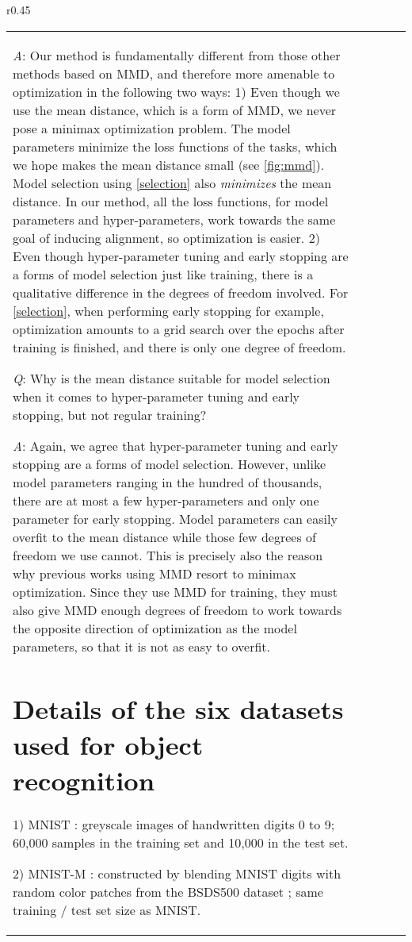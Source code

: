 \documentclass{article} \usepackage{iclr2020_conference,times}
\begin{document}
\begin{wraptable}{r}{0.45\textwidth}
\begin{tabular}{lcccc}
\emph{A}: 
Our method is fundamentally different from those other methods based on MMD, and therefore more amenable to optimization in the following two ways:
1) Even though we use the mean distance, which is a form of MMD, we never pose a minimax optimization problem. 
The model parameters minimize the loss functions of the tasks, which we hope makes the mean distance small (see \autoref{fig:mmd}).
Model selection using \autoref{selection} also \emph{minimizes} the mean distance.
In our method, all the loss functions, for model parameters and hyper-parameters, work towards the same goal of inducing alignment, so optimization is easier.
2) Even though hyper-parameter tuning and early stopping are a forms of model selection just like training, there is a qualitative difference in the degrees of freedom involved. For \autoref{selection}, when performing early stopping for example, optimization amounts to a grid search over the epochs after training is finished, and there is only one degree of freedom.

\emph{Q}: Why is the mean distance suitable for model selection when it comes to hyper-parameter tuning and early stopping, but not regular training?

\emph{A}: Again, we agree that hyper-parameter tuning and early stopping are a forms of model selection. However, unlike model parameters ranging in the hundred of thousands, there are at most a few hyper-parameters and only one parameter for early stopping. 
Model parameters can easily overfit to the mean distance while 
those few degrees of freedom we use cannot. 
This is precisely also the reason why previous works using MMD resort to minimax optimization. Since they use MMD for training, they must also give MMD enough degrees of freedom to work towards the opposite direction of optimization as the model parameters, so that it is not as easy to overfit.

\section{Details of the six datasets used for object recognition}
\label{details_six}
1) MNIST \citep{lecun1998gradient}: greyscale images of handwritten digits 0 to 9; 60,000 samples in the training set and 10,000 in the test set.

2) MNIST-M \citep{ganin2016domain}: constructed by blending MNIST digits with random color patches from the BSDS500 dataset \cite{arbelaez2011contour}; same training / test set size as MNIST.


\end{tabular}
\end{wraptable}
\end{document}
